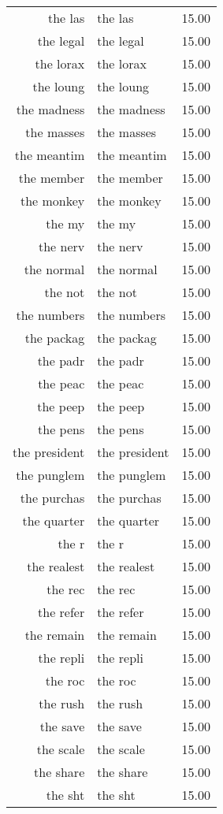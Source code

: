 \begin{table}[ht]
\begin{tabular}{rlr}
  the las & the las & 15.00 \\ 
  the legal & the legal & 15.00 \\ 
  the lorax & the lorax & 15.00 \\ 
  the loung & the loung & 15.00 \\ 
  the madness & the madness & 15.00 \\ 
  the masses & the masses & 15.00 \\ 
  the meantim & the meantim & 15.00 \\ 
  the member & the member & 15.00 \\ 
  the monkey & the monkey & 15.00 \\ 
  the my & the my & 15.00 \\ 
  the nerv & the nerv & 15.00 \\ 
  the normal & the normal & 15.00 \\ 
  the not & the not & 15.00 \\ 
  the numbers & the numbers & 15.00 \\ 
  the packag & the packag & 15.00 \\ 
  the padr & the padr & 15.00 \\ 
  the peac & the peac & 15.00 \\ 
  the peep & the peep & 15.00 \\ 
  the pens & the pens & 15.00 \\ 
  the president & the president & 15.00 \\ 
  the punglem & the punglem & 15.00 \\ 
  the purchas & the purchas & 15.00 \\ 
  the quarter & the quarter & 15.00 \\ 
  the r & the r & 15.00 \\ 
  the realest & the realest & 15.00 \\ 
  the rec & the rec & 15.00 \\ 
  the refer & the refer & 15.00 \\ 
  the remain & the remain & 15.00 \\ 
  the repli & the repli & 15.00 \\ 
  the roc & the roc & 15.00 \\ 
  the rush & the rush & 15.00 \\ 
  the save & the save & 15.00 \\ 
  the scale & the scale & 15.00 \\ 
  the share & the share & 15.00 \\ 
  the sht & the sht & 15.00 \\ 

\end{tabular}
\end{table}
